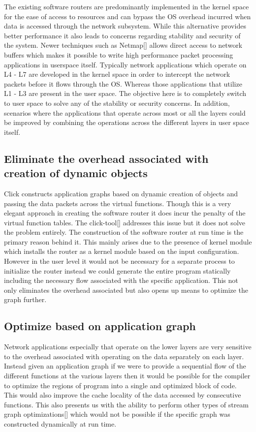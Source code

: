 \documentclass[conference]{IEEEtran}
\begin{document}
The existing software routers are predominantly implemented in the kernel space for the ease of access to resources and can bypass the OS overhead incurred when data is accessed through the network subsystem. While this alternative provides better performance it also leads to concerns regarding stability and security of the system. Newer techniques such as Netmap[] allows direct access to network buffers which makes it possible to write high performance packet processing applications in userspace itself. Typically network applications which operate on L4 - L7 are developed in the kernel space in order to intercept the network packets before it flows through the OS. Whereas those applications that utilize L1 - L3 are present in the user space. The objective here is to completely switch to user space to solve any of the stability or security concerns. In addition, scenarios where the applications that operate across most or all the layers could be improved by combining the operations across the different layers in user space itself.  

\subsection{Eliminate the overhead associated with creation of dynamic objects}

Click constructs application graphs based on dynamic creation of objects and passing the data packets across the virtual functions. Though this is a very elegant approach in creating the software router it does incur the penalty of the virtual function tables. The click-tool[] addresses this issue but it does not solve the problem entirely. The construction of the software router at run time is the primary reason behind it. This mainly arises due to the presence of kernel module which installs the router as a kernel module based on the input configuration. However in the user level it would not be necessary for a separate process to initialize the router instead we could generate the entire program statically including the necessary flow associated with the specific application. This not only eliminates the overhead associated but also opens up means to optimize the graph further. 

\subsection{Optimize based on application graph}

Network applications especially that operate on the lower layers are very sensitive to the overhead associated with operating on the data separately on each layer. Instead given an application graph if we were to provide a sequential flow of the different functions at the various layers then it would be possible for the compiler to optimize the regions of program into a single and optimized block of code. This would also improve the cache locality of the data accessed by consecutive functions. This also presents us with the ability to perform other types of stream graph optimizations[] which would not be possible if the specific graph was constructed dynamically at run time.
\end{document}
